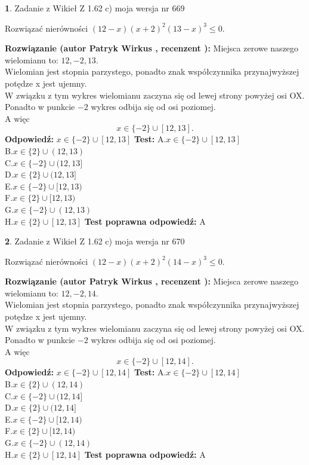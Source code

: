 \documentclass[12pt, a4paper]{article}
\theoremstyle{definition} %
\newtheorem{zad}{}
\newcommand{\zadStart}[1]{\begin{zad}#1\newline}
\newcommand{\zadStop}{\end{zad}}
\newcommand{\rozwStart}[2]{\noindent \textbf{Rozwiązanie (autor #1 , recenzent #2): }\newline}
\newcommand{\rozwStop}{\newline}
\newcommand{\odpStart}{\noindent \textbf{Odpowiedź:}\newline}
\newcommand{\odpStop}{\newline}
\newcommand{\testStart}{\noindent \textbf{Test:}\newline}
\newcommand{\testStop}{\newline}
\newcommand{\kluczStart}{\noindent \textbf{Test poprawna odpowiedź:}\newline}
\newcommand{\kluczStop}{\newline}
\begin{document}
\zadStart{Zadanie z Wikieł Z 1.62 c) moja wersja nr 669}

Rozwiązać nierówności $(12-x)(x+2)^{2}(13-x)^{3}\le0$.
\zadStop
\rozwStart{Patryk Wirkus}{}
Miejsca zerowe naszego wielomianu to: $12, -2, 13$.\\
Wielomian jest stopnia parzystego, ponadto znak współczynnika przy\linebreak najwyższej potędze x jest ujemny.\\ W związku z tym wykres wielomianu zaczyna się od lewej strony powyżej osi OX.\\
Ponadto w punkcie $-2$ wykres odbija się od osi poziomej.\\
A więc $$x \in \{-2\} \cup [12,13].$$
\rozwStop
\odpStart
$x \in \{-2\} \cup [12,13]$
\odpStop
\testStart
A.$x \in \{-2\} \cup [12,13]$\\
B.$x \in \{2\} \cup (12,13)$\\
C.$x \in \{-2\} \cup (12,13]$\\
D.$x \in \{2\} \cup (12,13]$\\
E.$x \in \{-2\} \cup [12,13)$\\
F.$x \in \{2\} \cup [12,13)$\\
G.$x \in \{-2\} \cup (12,13)$\\
H.$x \in \{2\} \cup [12,13]$
\testStop
\kluczStart
A
\kluczStop



\zadStart{Zadanie z Wikieł Z 1.62 c) moja wersja nr 670}

Rozwiązać nierówności $(12-x)(x+2)^{2}(14-x)^{3}\le0$.
\zadStop
\rozwStart{Patryk Wirkus}{}
Miejsca zerowe naszego wielomianu to: $12, -2, 14$.\\
Wielomian jest stopnia parzystego, ponadto znak współczynnika przy\linebreak najwyższej potędze x jest ujemny.\\ W związku z tym wykres wielomianu zaczyna się od lewej strony powyżej osi OX.\\
Ponadto w punkcie $-2$ wykres odbija się od osi poziomej.\\
A więc $$x \in \{-2\} \cup [12,14].$$
\rozwStop
\odpStart
$x \in \{-2\} \cup [12,14]$
\odpStop
\testStart
A.$x \in \{-2\} \cup [12,14]$\\
B.$x \in \{2\} \cup (12,14)$\\
C.$x \in \{-2\} \cup (12,14]$\\
D.$x \in \{2\} \cup (12,14]$\\
E.$x \in \{-2\} \cup [12,14)$\\
F.$x \in \{2\} \cup [12,14)$\\
G.$x \in \{-2\} \cup (12,14)$\\
H.$x \in \{2\} \cup [12,14]$
\testStop
\kluczStart
A
\kluczStop
\end{document}
